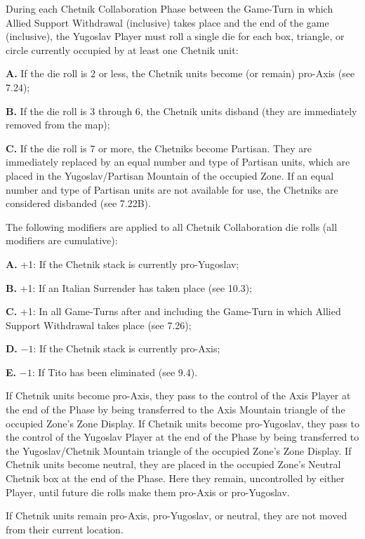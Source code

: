  During each Chetnik Collaboration Phase between the Game-Turn in which Allied Support Withdrawal (inclusive) takes place and the end of the game (inclusive), the Yugoslav Player must roll a single die for each box, triangle, or circle currently occupied by at least one Chetnik unit:

\textbf{A.} If the die roll is 2 or less, the Chetnik units become (or remain) pro-Axis (see 7.24);

\textbf{B.} If the die roll is 3 through 6, the Chetnik units disband (they are immediately removed from the map);

\textbf{C.} If the die roll is 7 or more, the Chetniks become Partisan. They are immediately replaced by an equal number and type of Partisan units, which are placed in the Yugoslav/Partisan Mountain of the occupied Zone. If an equal number and type of Partisan units are not available for use, the Chetniks are considered disbanded (see 7.22B).

 The following modifiers are applied to all Chetnik Collaboration die rolls (all modifiers are cumulative):

\textbf{A.} +1: If the Chetnik stack is currently pro-Yugoslav;

\textbf{B.} +1: If an Italian Surrender has taken place (see 10.3);

\textbf{C.} +1: In all Game-Turns after and including the Game-Turn in which Allied Support Withdrawal takes place (see 7.26);

\textbf{D.} $-1$: If the Chetnik stack is currently pro-Axis;

\textbf{E.} $-1$: If Tito has been eliminated (see 9.4).

 If Chetnik units become pro-Axis, they pass to the control of the Axis Player at the end of the Phase by being transferred to the Axis Mountain triangle of the occupied Zone’s Zone Display. If Chetnik units become pro-Yugoslav, they pass to the control of the Yugoslav Player at the end of the Phase by being transferred to the Yugoslav/Chetnik Mountain triangle of the occupied Zone’s Zone Display. If Chetnik units become neutral, they are placed in the occupied Zone’s Neutral Chetnik box at the end of the Phase. Here they remain, uncontrolled by either Player, until future die rolls make them pro-Axis or pro-Yugoslav.

 If Chetnik units remain pro-Axis, pro-Yugoslav, or neutral, they are not moved from their current location.

